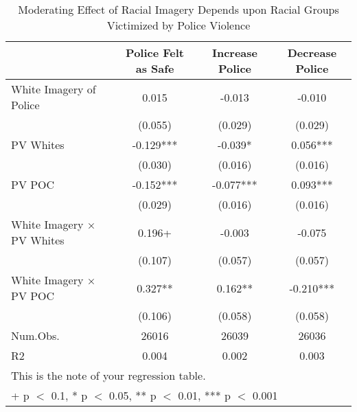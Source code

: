 \begin{table}

\caption{Moderating Effect of Racial Imagery Depends upon Racial Groups Victimized by Police Violence}
\centering
\begin{tabular}[t]{lccc}
\toprule
  & Police Felt as Safe & Increase Police & Decrease Police\\
\midrule
White Imagery of Police & 0.015 & -0.013 & -0.010\\
 & (0.055) & (0.029) & (0.029)\\
PV Whites & -0.129*** & -0.039* & 0.056***\\
 & (0.030) & (0.016) & (0.016)\\
PV POC & -0.152*** & -0.077*** & 0.093***\\
 & (0.029) & (0.016) & (0.016)\\
White Imagery × PV Whites & 0.196+ & -0.003 & -0.075\\
 & (0.107) & (0.057) & (0.057)\\
White Imagery × PV POC & 0.327** & 0.162** & -0.210***\\
 & (0.106) & (0.058) & (0.058)\\
\midrule
Num.Obs. & 26016 & 26039 & 26036\\
R2 & 0.004 & 0.002 & 0.003\\
\bottomrule
\multicolumn{4}{l}{\rule{0pt}{1em}This is the note of your regression table.}\\
\multicolumn{4}{l}{\rule{0pt}{1em}+ p $<$ 0.1, * p $<$ 0.05, ** p $<$ 0.01, *** p $<$ 0.001}\\
\end{tabular}
\end{table}
